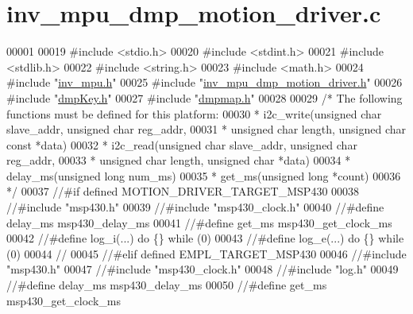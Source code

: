 \hypertarget{inv__mpu__dmp__motion__driver_8c_source}{}\section{inv\+\_\+mpu\+\_\+dmp\+\_\+motion\+\_\+driver.\+c}
\label{inv__mpu__dmp__motion__driver_8c_source}

\begin{DoxyCode}
00001 
00019 \textcolor{preprocessor}{#include <stdio.h>}
00020 \textcolor{preprocessor}{#include <stdint.h>}
00021 \textcolor{preprocessor}{#include <stdlib.h>}
00022 \textcolor{preprocessor}{#include <string.h>}
00023 \textcolor{preprocessor}{#include <math.h>}
00024 \textcolor{preprocessor}{#include "\hyperlink{inv__mpu_8h}{inv\_mpu.h}"}
00025 \textcolor{preprocessor}{#include "\hyperlink{inv__mpu__dmp__motion__driver_8h}{inv\_mpu\_dmp\_motion\_driver.h}"}
00026 \textcolor{preprocessor}{#include "\hyperlink{dmp_key_8h}{dmpKey.h}"}
00027 \textcolor{preprocessor}{#include "\hyperlink{dmpmap_8h}{dmpmap.h}"}
00028 
00029 \textcolor{comment}{/* The following functions must be defined for this platform:}
00030 \textcolor{comment}{ * i2c\_write(unsigned char slave\_addr, unsigned char reg\_addr,}
00031 \textcolor{comment}{ *      unsigned char length, unsigned char const *data)}
00032 \textcolor{comment}{ * i2c\_read(unsigned char slave\_addr, unsigned char reg\_addr,}
00033 \textcolor{comment}{ *      unsigned char length, unsigned char *data)}
00034 \textcolor{comment}{ * delay\_ms(unsigned long num\_ms)}
00035 \textcolor{comment}{ * get\_ms(unsigned long *count)}
00036 \textcolor{comment}{ */}
00037 \textcolor{comment}{//#if defined MOTION\_DRIVER\_TARGET\_MSP430}
00038 \textcolor{comment}{//#include "msp430.h"}
00039 \textcolor{comment}{//#include "msp430\_clock.h"}
00040 \textcolor{comment}{//#define delay\_ms    msp430\_delay\_ms}
00041 \textcolor{comment}{//#define get\_ms      msp430\_get\_clock\_ms}
00042 \textcolor{comment}{//#define log\_i(...)     do \{\} while (0)}
00043 \textcolor{comment}{//#define log\_e(...)     do \{\} while (0)}
00044 \textcolor{comment}{//}
00045 \textcolor{comment}{//#elif defined EMPL\_TARGET\_MSP430}
00046 \textcolor{comment}{//#include "msp430.h"}
00047 \textcolor{comment}{//#include "msp430\_clock.h"}
00048 \textcolor{comment}{//#include "log.h"}
00049 \textcolor{comment}{//#define delay\_ms    msp430\_delay\_ms}
00050 \textcolor{comment}{//#define get\_ms      msp430\_get\_clock\_ms}

\end{DoxyCode}
